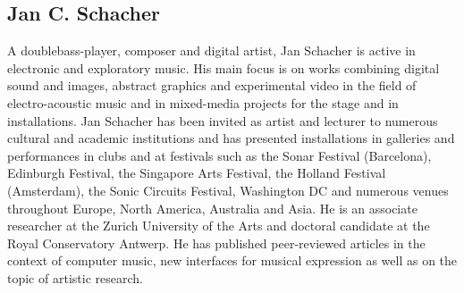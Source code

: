 \documentclass[a4paper]{article}
\begin{document}
\subsection*{Jan C. Schacher}
A doublebass-player, composer and digital artist, Jan Schacher is active in electronic and exploratory music. His main focus is on works combining digital sound and images, abstract graphics and experimental video in the field of electro-acoustic music and in mixed-media projects for the stage and in installations. Jan Schacher has been invited as artist and lecturer to numerous cultural and academic institutions and has presented installations in galleries and performances in clubs and at festivals such as the Sonar Festival (Barcelona), Edinburgh Festival, the Singapore Arts Festival, the Holland Festival (Amsterdam), the Sonic Circuits Festival, Washington DC and numerous venues throughout Europe, North America, Australia and Asia. He is an associate researcher at the Zurich University of the Arts and doctoral candidate at the Royal Conservatory Antwerp.
He has published peer-reviewed articles in the context of computer music, new interfaces for musical expression as well as on the topic of artistic research.
\end{document}
